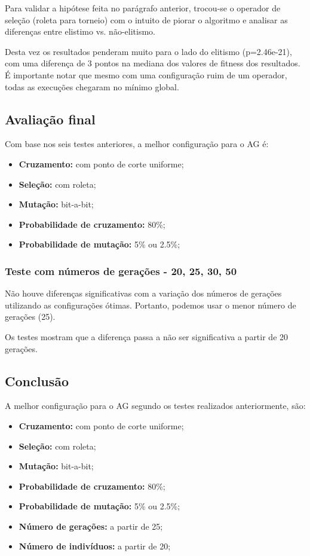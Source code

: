 \documentclass[11pt]{article}
\begin{document}
Para validar a hipótese feita no parágrafo anterior, trocou-se o operador de
seleção (roleta para torneio) com o intuito de piorar o algoritmo e analisar as
diferenças entre elistimo vs. não-elitismo.

Desta vez os resultados penderam muito para o lado do elitismo (p=2.46e-21),
com uma diferença de 3 pontos na mediana dos valores de fitness dos resultados.
É importante notar que mesmo com uma configuração ruim de um operador, todas as
execuções chegaram no mínimo global.

\subsection{Avaliação final}

Com base nos seis testes anteriores, a melhor configuração para o AG é:

\begin{itemize}
    \item \textbf{Cruzamento:} com ponto de corte uniforme;
    \item \textbf{Seleção:} com roleta;
    \item \textbf{Mutação:} bit-a-bit;
    \item \textbf{Probabilidade de cruzamento:} 80\%;
    \item \textbf{Probabilidade de mutação:} 5\% ou 2.5\%;
\end{itemize}

\subsubsection{Teste com números de gerações - 20, 25, 30, 50}

Não houve diferenças significativas com a variação dos números de gerações
utilizando as configurações ótimas. Portanto, podemos usar o menor número de
gerações (25).

Os testes mostram que a diferença passa a não ser significativa a partir de 20 gerações.

\subsection{Conclusão}

A melhor configuração para o AG segundo os testes realizados anteriormente, são:

\begin{itemize}
    \item \textbf{Cruzamento:} com ponto de corte uniforme;
    \item \textbf{Seleção:} com roleta;
    \item \textbf{Mutação:} bit-a-bit;
    \item \textbf{Probabilidade de cruzamento:} 80\%;
    \item \textbf{Probabilidade de mutação:} 5\% ou 2.5\%;
    \item \textbf{Número de gerações:} a partir de 25;
    \item \textbf{Número de indivíduos:} a partir de 20;
\end{itemize}

\end{document}
